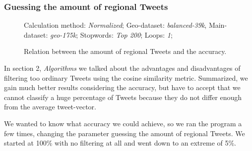 \documentclass[./Main.tex]{subfiles}
\begin{document}
\subsubsection{Guessing the amount of regional Tweets}
 \label{geo_guessing}
\begin{figure}[!b]
Calculation method: \textit{Normalized}; Geo-dataset: \textit{balanced-39k}, Main-dataset: \textit{geo-175k}; Stopwords: \textit{Top 200}; Loops: \textit{1}; 

  \caption{Relation between the amount of regional Tweets and the accuracy.}
  \label{geo_graph2}
\end{figure}
In section 2, \textit{Algorithms} we talked about the advantages and disadvantages of filtering too ordinary Tweets using the cosine similarity metric. Summarized, we gain much better results considering the accuracy, but have to accept that we cannot classify a huge percentage of Tweets because they do not differ enough from the average tweet-vector.

We wanted to know what accuracy we could achieve, so we ran the program a few times, changing the parameter guessing the amount of regional Tweets. We started at 100\% with no filtering at all and went down to an extreme of 5\%.
\end{document}
